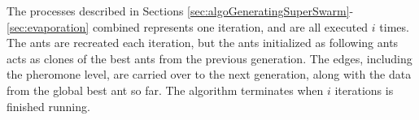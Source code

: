 
The processes described in Sections \ref{sec:algoGeneratingSuperSwarm}-\ref{sec:evaporation} combined represents one iteration, and are all executed $i$ times. The ants are recreated each iteration, but the ants initialized as following ants acts as clones of the best ants from the previous generation. The edges, including the pheromone level, are carried over to the next generation, along with the data from the global best ant so far. The algorithm terminates when $i$ iterations is finished running. 